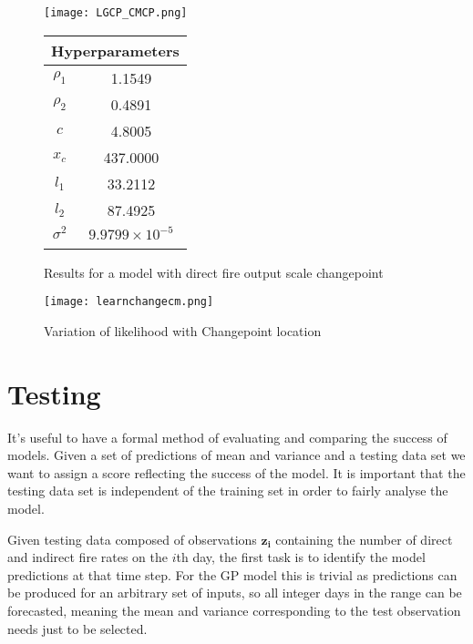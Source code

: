 \documentclass[a4paper,11pt]{report}
\begin{document}
  \begin{figure}[!ht]
    \centering
    \texttt{[image: LGCP\_CMCP.png]}
    \qquad
    \doublespacing
    \begin{tabular}[b]{cc}
    \multicolumn{2}{c}{\textbf{Hyperparameters}}                                            \\ \hline
      \(\rho_1\)                    & 1.1549                \\                       
\(\rho_2\)                     & 0.4891                           \\            
\(c\)                               & 4.8005                                      \\ 
\(x_c\)                        & 437.0000                                         \\ 
\(l_1\)                               & 33.2112                                      \\  
\(l_2\) & 87.4925 \\ 
\(\sigma^2\) & \(9.9799 \times 10^{-5}\) \\ 
& \\
    \end{tabular}
    \captionsetup{labelformat=andtable}
    \caption{Results for a model with direct fire output scale changepoint}
  \end{figure}
  
\begin{figure}
\centering
\texttt{[image: learnchangecm.png]}
\caption{Variation of likelihood with Changepoint location}
\label{fig:cmcpvariation}
\end{figure}


\chapter{Testing}

It's useful to have a formal method of evaluating and comparing the success of models. Given a set of predictions of mean and variance and a testing data set we want to assign a score reflecting the success of the model. It is important that the testing data set is independent of the training set in order to fairly analyse the model. \par

Given testing data composed of observations \(\mathbf{z_i}\) containing the number of direct and indirect fire rates on the \(i\)th day, the first task is to identify the model predictions at that time step. For the GP model this is trivial as predictions can be produced for an arbitrary set of inputs, so all integer days in the range can be forecasted, meaning the mean and variance corresponding to the test observation needs just to be selected. \par 
\end{document}
